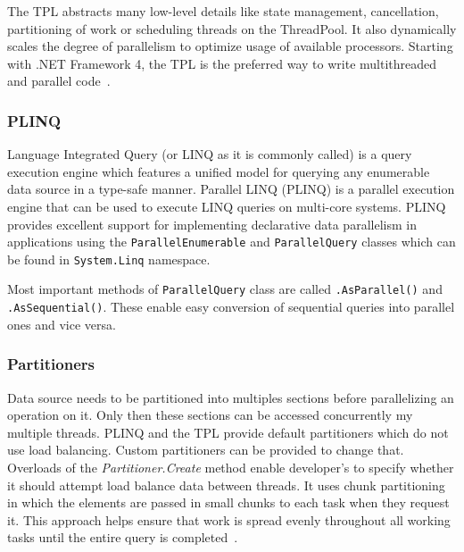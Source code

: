 The TPL abstracts many low-level details like state management, cancellation, partitioning of work or scheduling threads on the ThreadPool. It also dynamically scales the degree of parallelism to optimize usage of available processors. Starting with .NET Framework 4, the TPL is the preferred way to write multithreaded and parallel code~\cite{Leijen2009}.

\subsubsection{PLINQ}
\label{sec:PLINQ} %
Language Integrated Query (or LINQ as it is commonly called) is a query execution engine which features a unified model for querying any enumerable data source in a type-safe manner. Parallel LINQ (PLINQ) is a parallel execution engine that can be used to execute LINQ queries on multi-core systems. PLINQ provides excellent support for implementing declarative data parallelism in applications using the \texttt{ParallelEnumerable} and \texttt{ParallelQuery} classes which can be found in \texttt{System.Linq} namespace.

Most important methods of \texttt{ParallelQuery} class are called \texttt{.AsParallel()} and \texttt{.AsSequential()}. These enable easy conversion of sequential queries into parallel ones and vice versa.

\subsubsection{Partitioners}
\label{sec:Partitioners}
Data source needs to be partitioned into multiples sections before parallelizing an operation on it. Only then these sections can be accessed concurrently my multiple threads. PLINQ and the TPL provide default partitioners which do not use load balancing. Custom partitioners can be provided to change that. Overloads of the \emph{Partitioner.Create} method enable developer's to specify whether it should attempt load balance data between threads. It uses chunk partitioning in which the elements are passed in small chunks to each task when they request it. This approach helps ensure that work is spread evenly throughout all working tasks until the entire query is completed~\cite{Partitioners}.

